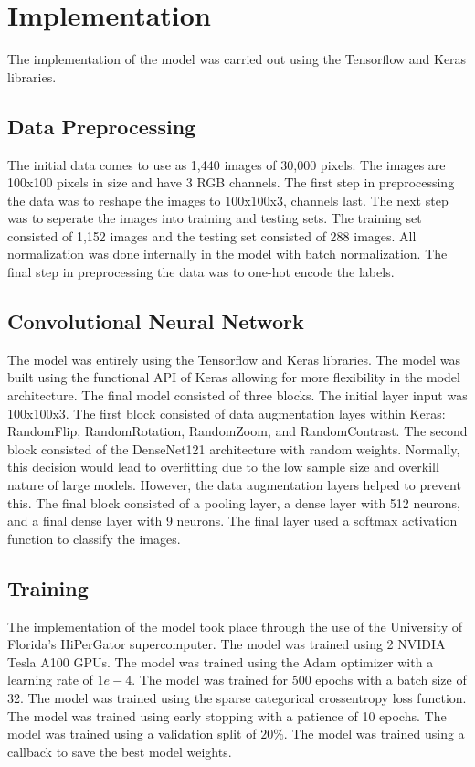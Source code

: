 \documentclass[conference]{IEEEtran}
\begin{document}
\section{Implementation}
The implementation of the model was carried out using the Tensorflow and Keras libraries.

\subsection{Data Preprocessing}
The initial data comes to use as 1,440 images of 30,000 pixels. The images are 100x100 pixels in size and have 3 RGB channels. The first step in preprocessing the data was to reshape the images to 100x100x3, channels last. The next step was to seperate the images into training and testing sets. The training set consisted of 1,152 images and the testing set consisted of 288 images. All normalization was done internally in the model with batch normalization. The final step in preprocessing the data was to one-hot encode the labels.

\subsection{Convolutional Neural Network}
The model was entirely using the Tensorflow and Keras libraries. The model was built using the functional API of Keras allowing for more flexibility in the model architecture. The final model consisted of three blocks. The initial layer input was 100x100x3. The first block consisted of data augmentation layes within Keras: RandomFlip, RandomRotation, RandomZoom, and RandomContrast. The second block consisted of the DenseNet121 architecture with random weights. Normally, this decision would lead to overfitting due to the low sample size and overkill nature of large models. However, the data augmentation layers helped to prevent this. The final block consisted of a pooling layer, a dense layer with 512 neurons, and a final dense layer with 9 neurons. The final layer used a softmax activation function to classify the images.

\subsection{Training}
The implementation of the model took place through the use of the University of Florida's HiPerGator supercomputer. The model was trained using 2 NVIDIA Tesla A100 GPUs. The model was trained using the Adam optimizer with a learning rate of $1e-4$. The model was trained for 500 epochs with a batch size of 32. The model was trained using the sparse categorical crossentropy loss function. The model was trained using early stopping with a patience of 10 epochs. The model was trained using a validation split of $20\%$. The model was trained using a callback to save the best model weights.
\end{document}
